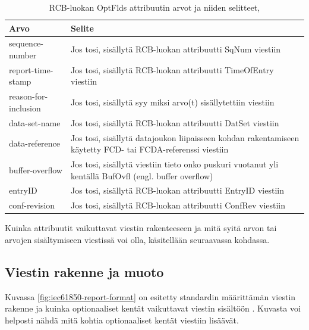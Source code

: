 \begin{table}[ht!]
	\caption{RCB-luokan OptFlds attribuutin arvot ja niiden selitteet,}
	\label{tab:iec61850-optional-fields-definition}
	\begin{tabular}{l | l}
		\hline
		\textbf{Arvo} & \textbf{Selite} \\
		\hline \hline
		sequence-number & Jos tosi, sisällytä RCB-luokan attribuutti SqNum viestiin \\
		report-time-stamp & Jos tosi, sisällytä RCB-luokan attribuutti TimeOfEntry viestiin \\
		reason-for-inclusion & Jos tosi, sisällytä syy miksi arvo(t) sisällytettiin viestiin \\
		data-set-name & Jos tosi, sisällytä RCB-luokan attribuutti DatSet viestiin \\
		data-reference & \parbox[t]{10cm}{Jos tosi, sisällytä datajoukon liipaisseen kohdan rakentamiseen käytetty FCD- tai FCDA-referenssi viestiin} \\
		buffer-overflow & \parbox[t]{10cm}{Jos tosi, sisällytä viestiin tieto onko puskuri vuotanut yli kentällä BufOvfl (engl. buffer overflow)} \\
		entryID & Jos tosi, sisällytä RCB-luokan attribuutti EntryID viestiin \\
		conf-revision & Jos tosi, sisällytä RCB-luokan attribuutti ConfRev viestiin \\
		\hline
	\end{tabular}
\end{table}

Kuinka attribuutit vaikuttavat viestin rakenteeseen ja mitä syitä arvon tai arvojen sisältymiseen viestissä voi olla, käsitellään seuraavassa kohdassa.


\subsection{Viestin rakenne ja muoto}
Kuvassa \ref{fig:iec61850-report-format} on esitetty standardin määrittämän viestin rakenne ja kuinka optionaaliset kentät vaikuttavat viestin sisältöön \cite[s.~104]{IEC61850-7-2}. Kuvasta voi helposti nähdä mitä kohtia optionaaliset kentät viestiin lisäävät.

